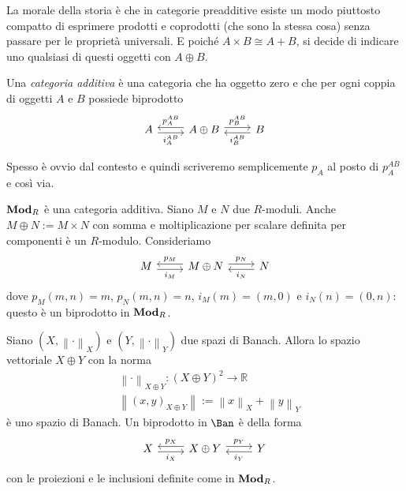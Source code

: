 La morale della storia è che in categorie preadditive esiste un modo
piuttosto compatto di esprimere prodotti e coprodotti (che sono la
stessa cosa) senza passare per le proprietà universali. E poiché
\(A \times B \cong A + B\), si decide di indicare uno qualsiasi di
questi oggetti con \(A \oplus B\).

\begin{definition}
  Una {\em categoria additiva} è una categoria che ha oggetto zero e che
  per ogni coppia di oggetti \(A\) e \(B\) possiede biprodotto
  \[
    \begin{tikzcd}
      A \ar["{i_A^{AB}}", r, shift right, swap] & A \oplus B
      \ar["{p_A^{AB}}", l, shift right, swap] \ar["{p_B^{AB}}", r, shift
      left] & B \ar["{i_B^{AB}}", l, shift left]
    \end{tikzcd}
  \]
\end{definition}

Spesso è ovvio dal contesto e quindi scriveremo semplicemente \(p_A\) al
posto di \(p_A^{AB}\) e così via.

\begin{example}
  \(\mathbf{Mod}_R\) è una categoria additiva. Siano \(M\) e \(N\) due
  \(R\)-moduli. Anche \(M \oplus N := M \times N\) con somma e moltiplicazione per
  scalare definita per componenti è un \(R\)-modulo. Consideriamo
  \[
    \begin{tikzcd}
      M \ar["{i_M}", r, shift right, swap] & M \oplus N
      \ar["{p_M}", l, shift right, swap] \ar["{p_N}", r, shift
      left] & N \ar["{i_N}", l, shift left]
    \end{tikzcd}
  \]
  dove \(p_M(m, n) = m\), \(p_N(m, n) = n\), \(i_M (m) = (m, 0)\) e
  \(i_N(n) = (0, n)\): questo è un biprodotto in \(\mathbf{Mod}_R\).
\end{example}

\begin{example}
  Siano \((X, \left\lVert \cdot \right\rVert_X)\) e
  \((Y, \left\lVert \cdot \right\rVert_Y)\) due spazi di Banach. Allora lo
  spazio vettoriale \(X \oplus Y\) con la norma
  \begin{align*}
    & \left\lVert \cdot \right\rVert_{X \oplus Y} : (X \oplus Y)^2 \to \mathbb{R} \\
    & \left\lVert (x, y)_{X \oplus Y} \right\rVert := \left\lVert x \right\rVert_X + \left\lVert y \right\rVert_Y
  \end{align*}
  è uno spazio di Banach. Un biprodotto in \(\Ban\) è della forma
  \[
    \begin{tikzcd}
      X \ar["{i_X}", r, shift right, swap] & X \oplus Y \ar["{p_X}", l, shift
      right, swap] \ar["{p_Y}", r, shift left] & Y \ar["{i_Y}", l, shift
      left]
    \end{tikzcd}
  \]
  con le proiezioni e le inclusioni definite come in \(\mathbf{Mod}_R\).
\end{example}

